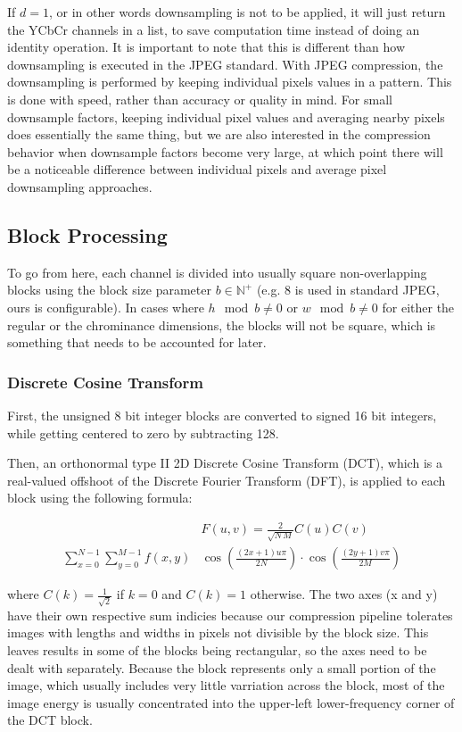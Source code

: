 If \(d = 1\), or in other words downsampling is not to be applied, it will just return the YCbCr channels in a list, to save computation time instead of doing an identity operation.
It is important to note that this is different than how downsampling is executed in the JPEG standard. 
With JPEG compression, the downsampling is performed by keeping individual pixels values in a pattern.
This is done with speed, rather than accuracy or quality in mind. 
For small downsample factors, keeping individual pixel values and averaging nearby pixels does essentially the same thing, but we are also interested in the compression behavior when downsample factors become very large, at which point there will be a noticeable difference between individual pixels and average pixel downsampling approaches.

\subsection{Block Processing}
To go from here, each channel is divided into usually square non-overlapping blocks using the block size parameter \(b \in \mathbb{N}^+\) (e.g. 8 is used in standard JPEG, ours is configurable). In cases where \(h \mod b \neq 0\) or \(w \mod b \neq 0\) for either the regular or the chrominance dimensions, the blocks will not be square, which is something that needs to be accounted for later. 

\subsubsection{Discrete Cosine Transform}
First, the unsigned 8 bit integer blocks are converted to signed 16 bit integers, while getting centered to zero by subtracting 128.

Then, an orthonormal type II 2D Discrete Cosine Transform (DCT), which is a real-valued offshoot of the Discrete Fourier Transform (DFT), is applied to each block using the following formula:

\begin{align}
  &F(u, v) = \frac{2}{\sqrt{N \, M}} C(u)C(v) \\ \sum_{x=0}^{N-1} \sum_{y=0}^{M-1} f(x,y)
  &\cos\left( \frac{(2x+1)u\pi}{2N} \right) \cdot \cos\left( \frac{(2y+1)v\pi}{2M} \right)
\end{align}

where $C(k) = \frac{1}{\sqrt{2}}$ if $k = 0$ and $C(k) = 1$ otherwise. The two axes (x and y) have their own respective sum indicies because our compression pipeline tolerates images with lengths and widths in pixels not divisible by the block size. This leaves results in some of the blocks being rectangular, so the axes need to be dealt with separately. Because the block represents only a small portion of the image, which usually includes very little varriation across the block, most of the image energy is usually concentrated into the upper-left lower-frequency corner of the DCT block.

